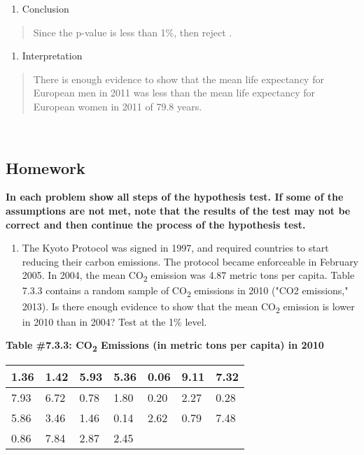 \documentclass[]{book}
\providecommand{\tightlist}{%
  \setlength{\itemsep}{0pt}\setlength{\parskip}{0pt}}
\begin{document}
\begin{enumerate}
\def\labelenumi{\arabic{enumi}.}
\setcounter{enumi}{4}
\tightlist
\item
  Conclusion
\end{enumerate}

\begin{quote}
Since the p-value is less than 1\%, then reject .
\end{quote}

\begin{enumerate}
\def\labelenumi{\arabic{enumi}.}
\setcounter{enumi}{5}
\tightlist
\item
  Interpretation
\end{enumerate}

\begin{quote}
There is enough evidence to show that the mean life expectancy for
European men in 2011 was less than the mean life expectancy for
European women in 2011 of 79.8 years.
\end{quote}

\textbf{\\
}

\hypertarget{homework-22}{%
\subsection{Homework}\label{homework-22}}

\textbf{In each problem show all steps of the hypothesis test. If some of the
assumptions are not met, note that the results of the test may not be
correct and then continue the process of the hypothesis test.}

\begin{enumerate}
\def\labelenumi{\arabic{enumi}.}
\tightlist
\item
  The Kyoto Protocol was signed in 1997, and required countries to
  start reducing their carbon emissions. The protocol became
  enforceable in February 2005. In 2004, the mean CO\textsubscript{2} emission was
  4.87 metric tons per capita. Table 7.3.3 contains a random sample of
  CO\textsubscript{2} emissions in 2010 ("CO2 emissions," 2013). Is there enough
  evidence to show that the mean CO\textsubscript{2} emission is lower in 2010 than
  in 2004? Test at the 1\% level.
\end{enumerate}

\textbf{Table \#7.3.3: CO\textsubscript{2} Emissions (in metric tons per capita) in 2010}

\begin{longtable}[]{@{}lllllll@{}}
\toprule
1.36 & 1.42 & 5.93 & 5.36 & 0.06 & 9.11 & 7.32\tabularnewline
\midrule
\endhead
7.93 & 6.72 & 0.78 & 1.80 & 0.20 & 2.27 & 0.28\tabularnewline
5.86 & 3.46 & 1.46 & 0.14 & 2.62 & 0.79 & 7.48\tabularnewline
0.86 & 7.84 & 2.87 & 2.45 & & &\tabularnewline
\bottomrule
\end{longtable}
\end{document}
